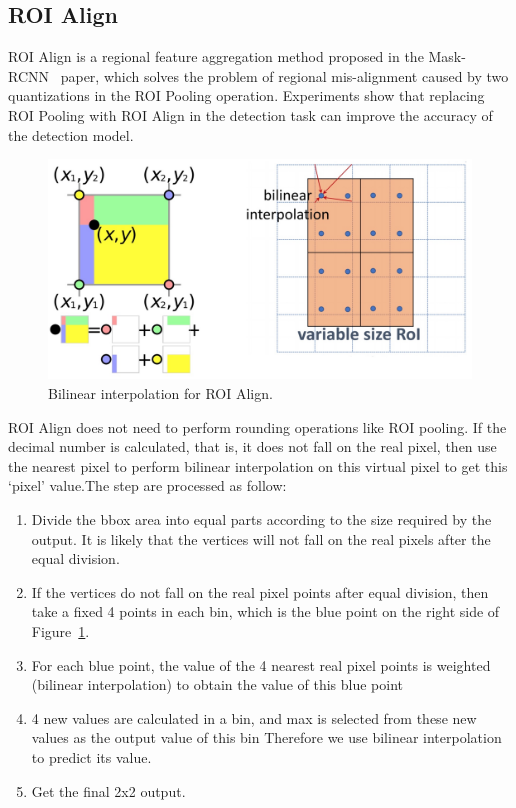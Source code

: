 \label{sec:roialign}
\subsection{ROI Align}
ROI Align is a regional feature aggregation method proposed in the Mask-RCNN~\cite{he2018mask} paper, which solves the problem of regional mis-alignment caused by two quantizations in the ROI Pooling operation. Experiments show that replacing ROI Pooling with ROI Align in the detection task can improve the accuracy of the detection model.

\begin{figure}[!htbp]
	\centering
	\includegraphics[width=1\linewidth]{figures/roi_align}
	\caption[Bilinear interpolation for ROI Align]{Bilinear interpolation for ROI Align.}
	\label{fig:roialign}
\end{figure}

ROI Align does not need to perform rounding operations like ROI pooling. If the decimal number is calculated, that is, it does not fall on the real pixel, then use the nearest pixel to perform bilinear interpolation on this virtual pixel to get this `pixel'  value.The step are processed as follow:

\begin{enumerate}[1.]
	\item Divide the bbox area into equal parts according to the size required by the output. It is likely that the vertices will not fall on the real pixels after the equal division.
	\item If the vertices do not fall on the real pixel points after equal division, then take a fixed 4 points in each bin, which is the blue point on the right side of Figure~\ref{fig:roialign}.
	\item For each blue point, the value of the 4 nearest real pixel points is weighted (bilinear interpolation) to obtain the value of this blue point
	\item  4 new values are calculated in a bin, and max is selected from these new values as the output value of this bin Therefore we use bilinear interpolation to predict its value.
	\item Get the final 2x2 output.
\end{enumerate}

